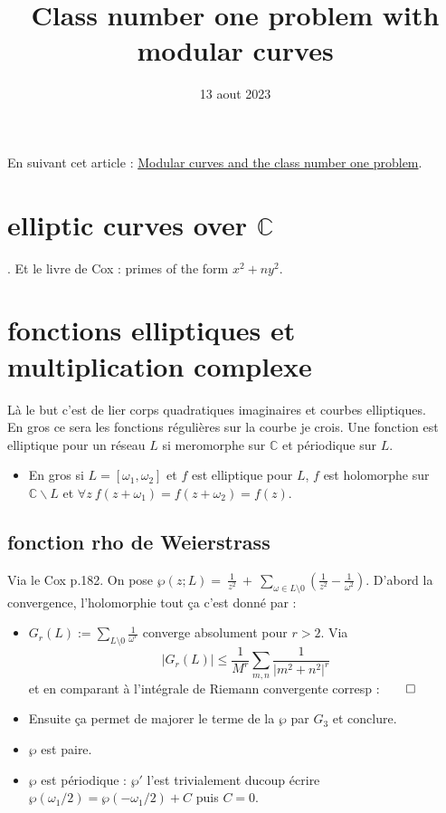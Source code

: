 \documentclass[12pt]{article}
\title{Class number one problem with modular curves}
\date{13 aout 2023}
\newcommand{\C}{\mathbb{C}}
\newcommand{\w}{\omega}
\begin{document}
\maketitle

En suivant cet article : \href{https://people.clas.ufl.edu/jeremybooher/files/class_number_one.pdf}{Modular curves and the class number one problem}.
\section{elliptic curves over $\C$}. Et le livre de Cox : primes of the form $x^2+ny^2$.

\section{fonctions elliptiques et multiplication complexe}
Là le but c'est de lier corps quadratiques imaginaires et courbes elliptiques.\\
En gros ce sera les fonctions régulières sur la courbe je crois. Une fonction est elliptique pour un réseau $L$ si meromorphe sur $\C$ et périodique sur 
$L$. 

\begin{itemize}
    \item En gros si $L=[\w_1, \w_2]$ et $f$ est elliptique pour $L$, $f$ est holomorphe sur $\C\backslash L$ et $\forall z~f(z+\w_1)=f(z+\w_2)=f(z)$.
\end{itemize}

\subsection{fonction rho de Weierstrass}
Via le Cox p.182. On pose $\wp(z;L)=~\frac{1}{z^2}~+~\sum_{\w\in L\setminus{0}}\left(\frac{1}{z^2}-\frac{1}{\w^2}\right)$. D'abord la convergence, l'holomorphie tout ça c'est donné par : 
\begin{itemize}
    \item $G_r(L):=\sum_{L\setminus{0}}\frac{1}{\w^r}$ converge absolument pour $r>2$. Via $$\lvert G_r(L)\rvert\leq\frac{1}{M^r}\sum_{m,n} \frac{1}{\lvert m^2+n^2\rvert^r}$$ et en comparant
à l'intégrale de Riemann convergente corresp :$\qed$
    \item Ensuite ça permet de majorer le terme de la $\wp$ par $G_3$ et conclure.
    \item $\wp$ est paire.
    \item $\wp$ est périodique : $\wp '$ l'est trivialement ducoup écrire $\wp(\w_1/2)=\wp(-\w_1/2)+C$ puis $C=0$.
\end{itemize}
\end{document}
